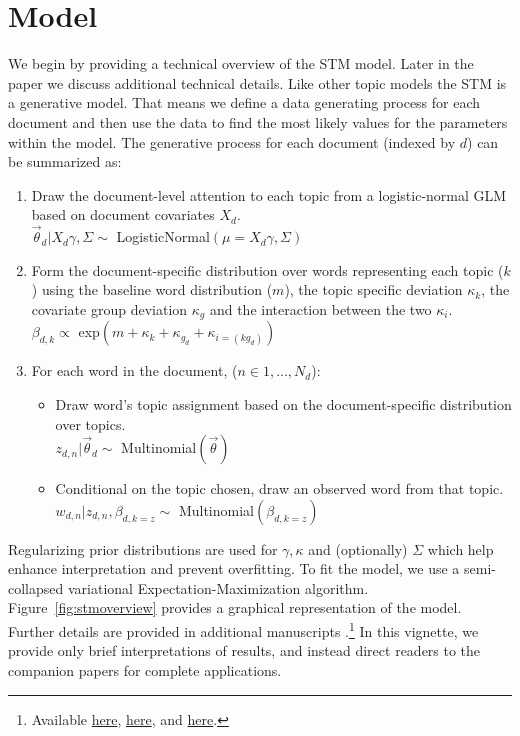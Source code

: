 \documentclass[nojss]{jss}
\begin{document}
\section{Model}
\label{sec:est}

We begin by providing a technical overview of the STM model. Later in the paper we discuss additional technical details. Like other topic models the STM is a generative model. That means we define a data generating process for each document and then use the data to find the most likely values for the parameters within the model.  The generative process for each document (indexed by $d$) can be summarized as:

\begin{enumerate}
\item Draw the document-level attention to each topic from a logistic-normal GLM based on document covariates $X_d$. \\
$\vec{\theta}_d | X_d\gamma, \Sigma \sim$ LogisticNormal$(\mu = X_d\gamma, \Sigma)$
\item Form the document-specific distribution over words representing each topic ($k$) using the baseline word distribution ($m$), the topic specific deviation $\kappa_k$, the covariate group deviation $\kappa_g$ and the interaction between the two $\kappa_i$.\\
$\beta_{d,k} \propto $ exp$(m + \kappa_{k} + \kappa_{g_d} + \kappa_{i=(kg_d)})$
\item For each word in the document, ($n \in 1, \dots, N_d$):
\begin{itemize}
\item Draw word's topic assignment based on the document-specific distribution over topics.\\
 $z_{d,n} | \vec{\theta}_d \sim $ Multinomial$(\vec{\theta})$
\item Conditional on the topic chosen, draw an observed word from that topic.\\
$ w_{d,n} | z_{d,n}, \beta_{d,k=z} \sim $ Multinomial$(\beta_{d,k=z})$
\end{itemize}
\end{enumerate}

Regularizing prior distributions are used for $\gamma, \kappa$ and (optionally) $\Sigma$ which help enhance interpretation and prevent overfitting.  To fit the model, we use a semi-collapsed variational Expectation-Maximization algorithm.  Figure~\ref{fig:stmoverview} provides a graphical representation of the model. Further details are provided in additional manuscripts \citep{nips2013,STMEdo,ajps,TextComparative}.\footnote{Available \href{http://scholar.harvard.edu/files/dtingley/files/topicmodelsopenendedexperiments.pdf}{here}, \href{http://scholar.harvard.edu/files/bstewart/files/stmnips2013.pdf}{here}, and \href{http://scholar.harvard.edu/files/dtingley/files/comparativepoliticstext.pdf}{here}.} In this vignette, we provide only brief interpretations of results, and instead direct readers to the companion papers for complete applications.
\end{document}
